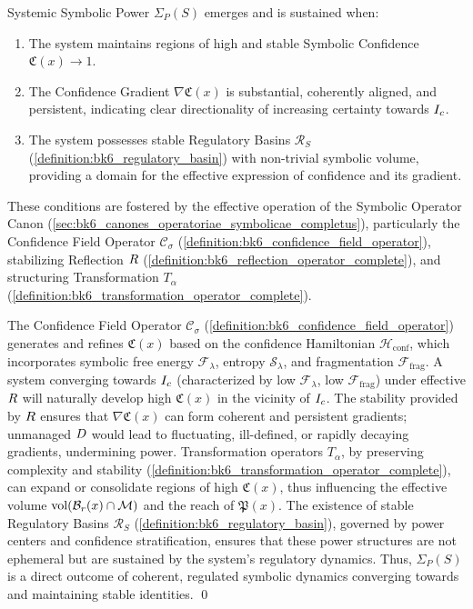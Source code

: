 \begin{proposition}
\label{proposition:bk7_power_from_coherent_confidence_regulation}
Systemic Symbolic Power \(\Sigma_P(S)\) emerges and is sustained when:
\begin{enumerate}
    \item The system maintains regions of high and stable Symbolic Confidence \(\mathfrak{C}(x) \to 1\).
    \item The Confidence Gradient \(\nabla \mathfrak{C}(x)\) is substantial, coherently aligned, and persistent, indicating clear directionality of increasing certainty towards \(I_c\).
    \item The system possesses stable Regulatory Basins \(\mathcal{R}_S\) (\ref{definition:bk6_regulatory_basin}) with non-trivial symbolic volume, providing a domain for the effective expression of confidence and its gradient.
\end{enumerate}
These conditions are fostered by the effective operation of the Symbolic Operator Canon (\ref{sec:bk6_canones_operatoriae_symbolicae_completus}), particularly the Confidence Field Operator \(\mathcal{C}_\sigma\) (\ref{definition:bk6_confidence_field_operator}), stabilizing Reflection \(R\) (\ref{definition:bk6_reflection_operator_complete}), and structuring Transformation \(T_\alpha\) (\ref{definition:bk6_transformation_operator_complete}).
\end{proposition}
\begin{demonstratio}
\label{demonstratio:bk7_operator_basis_systemic_power}
The Confidence Field Operator \(\mathcal{C}_\sigma\) (\ref{definition:bk6_confidence_field_operator}) generates and refines \(\mathfrak{C}(x)\) based on the confidence Hamiltonian \(\mathcal{H}_{\text{conf}}\), which incorporates symbolic free energy \(\mathcal{F}_\lambda\), entropy \(\mathcal{S}_\lambda\), and fragmentation \(\mathcal{F}_{\text{frag}}\). A system converging towards \(I_c\) (characterized by low \(\mathcal{F}_\lambda\), low \(\mathcal{F}_{\text{frag}}\)) under effective \(R\) will naturally develop high \(\mathfrak{C}(x)\) in the vicinity of \(I_c\).
The stability provided by \(R\) ensures that \(\nabla \mathfrak{C}(x)\) can form coherent and persistent gradients; unmanaged \(D\) would lead to fluctuating, ill-defined, or rapidly decaying gradients, undermining power.
Transformation operators \(T_\alpha\), by preserving complexity and stability (\ref{definition:bk6_transformation_operator_complete}), can expand or consolidate regions of high \(\mathfrak{C}(x)\), thus influencing the effective volume \(\text{vol}(\mathcal{B}_r(x) \cap \mathcal{M})\) and the reach of \(\mathfrak{P}(x)\).
The existence of stable Regulatory Basins \(\mathcal{R}_S\) (\ref{definition:bk6_regulatory_basin}), governed by power centers and confidence stratification, ensures that these power structures are not ephemeral but are sustained by the system's regulatory dynamics. Thus, \(\Sigma_P(S)\) is a direct outcome of coherent, regulated symbolic dynamics converging towards and maintaining stable identities. \qed
\end{demonstratio}


